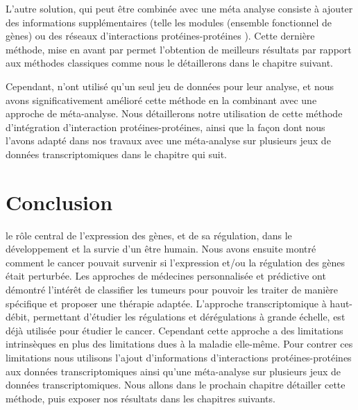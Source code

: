 			L'autre solution, qui peut être combinée avec une méta analyse consiste à ajouter des informations supplémentaires (telle les modules (ensemble fonctionnel de gènes) \citep{VanVliet2007} ou des réseaux d'interactions protéines-protéines \citep{Chuang2007}).
			Cette dernière méthode, mise en avant par \citeauthor{Chuang2007} permet l'obtention de meilleurs résultats par rapport aux méthodes classiques comme nous le détaillerons dans le chapitre suivant.

			Cependant, \citeauthor{Chuang2007} n'ont utilisé qu'un seul jeu de données pour leur analyse, et nous avons significativement amélioré cette méthode en la combinant avec une approche de méta-analyse.
			Nous détaillerons notre utilisation de cette méthode d'intégration d'interaction protéines-protéines, ainsi que la façon dont nous l'avons adapté dans nos travaux avec une méta-analyse sur plusieurs jeux de données transcriptomiques dans le chapitre qui suit.

	\section{\textcolor{red!45!black}{Conclusion}}

		 le rôle central de l'expression des gènes, et de sa régulation, dans le développement et la survie d'un être humain.
		Nous avons ensuite montré comment le cancer pouvait survenir si l'expression et/ou la régulation des gènes était perturbée.
		Les approches de médecines personnalisée et prédictive ont démontré l'intérêt de classifier les tumeurs pour pouvoir les traiter de manière spécifique et proposer une thérapie adaptée.
		L'approche transcriptomique à haut-débit, permettant d'étudier les régulations et dérégulations à grande échelle, est déjà utilisée pour étudier le cancer.
		Cependant cette approche a des limitations intrinsèques en plus des limitations dues à la maladie elle-même.
		Pour contrer ces limitations nous utilisons l'ajout d'informations d'interactions protéines-protéines aux données transcriptomiques ainsi qu'une méta-analyse sur plusieurs jeux de données transcriptomiques.
		Nous allons dans le prochain chapitre détailler cette méthode, puis exposer nos résultats dans les chapitres suivants.